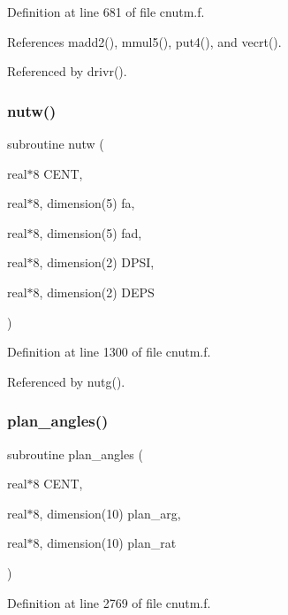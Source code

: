 Definition at line 681 of file cnutm.\+f.



References madd2(), mmul5(), put4(), and vecrt().



Referenced by drivr().

\mbox{\label{cnutm_8f_a3e3e399e615ed939a743d989ccc434c6}} 
\subsubsection{\texorpdfstring{nutw()}{nutw()}}
{\footnotesize\ttfamily subroutine nutw (\begin{DoxyParamCaption}\item[{real$\ast$8}]{C\+E\+NT,  }\item[{real$\ast$8, dimension(5)}]{fa,  }\item[{real$\ast$8, dimension(5)}]{fad,  }\item[{real$\ast$8, dimension(2)}]{D\+P\+SI,  }\item[{real$\ast$8, dimension(2)}]{D\+E\+PS }\end{DoxyParamCaption})}



Definition at line 1300 of file cnutm.\+f.



Referenced by nutg().

\mbox{\label{cnutm_8f_ade23a11bbee6fe4b73da3991da418251}} 
\subsubsection{\texorpdfstring{plan\+\_\+angles()}{plan\_angles()}}
{\footnotesize\ttfamily subroutine plan\+\_\+angles (\begin{DoxyParamCaption}\item[{real$\ast$8}]{C\+E\+NT,  }\item[{real$\ast$8, dimension(10)}]{plan\+\_\+arg,  }\item[{real$\ast$8, dimension(10)}]{plan\+\_\+rat }\end{DoxyParamCaption})}



Definition at line 2769 of file cnutm.\+f.



